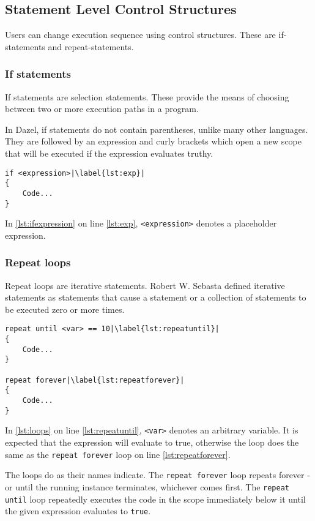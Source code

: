     
\subsection{Statement Level Control Structures}
Users can change execution sequence using control structures. These are if-statements and repeat-statements.
\subsubsection{If statements}
If statements are selection statements. These provide the means of choosing between two or more execution paths in a program\cite{sebesta_concepts_2016}.

In Dazel, if statements do not contain parentheses, unlike many other languages. They are followed by an expression and curly brackets which open a new scope that will be executed if the expression evaluates truthy.

\begin{lstlisting}[caption={Example of an if statement}, label={lst:ifexpression},escapechar=|]
if <expression>|\label{lst:exp}|
{
    Code...
}
\end{lstlisting}

In \ref{lst:ifexpression} on line \ref{lst:exp},  \verb|<expression>| denotes a placeholder expression.

\subsubsection{Repeat loops}
Repeat loops are iterative statements. Robert W. Sebasta defined iterative statements as statements that cause a statement or a collection of statements to be executed zero or more times\cite{sebesta_concepts_2016}.

\begin{lstlisting}[caption={Example of loops}, label={lst:loops},escapechar=|]
repeat until <var> == 10|\label{lst:repeatuntil}|
{
    Code...
}

repeat forever|\label{lst:repeatforever}|
{
    Code...
}
\end{lstlisting}

In \ref{lst:loops} on line \ref{lst:repeatuntil}, \verb|<var>| denotes an arbitrary variable. It is expected that the expression will evaluate to true, otherwise the loop does the same as the \verb|repeat forever| loop on line \ref{lst:repeatforever}.

The loops do as their names indicate. The \verb|repeat forever| loop repeats forever - or until the running instance terminates, whichever comes first. %
The \verb|repeat until| loop repeatedly executes the code in the scope immediately below it until the given expression evaluates to \verb|true|.

